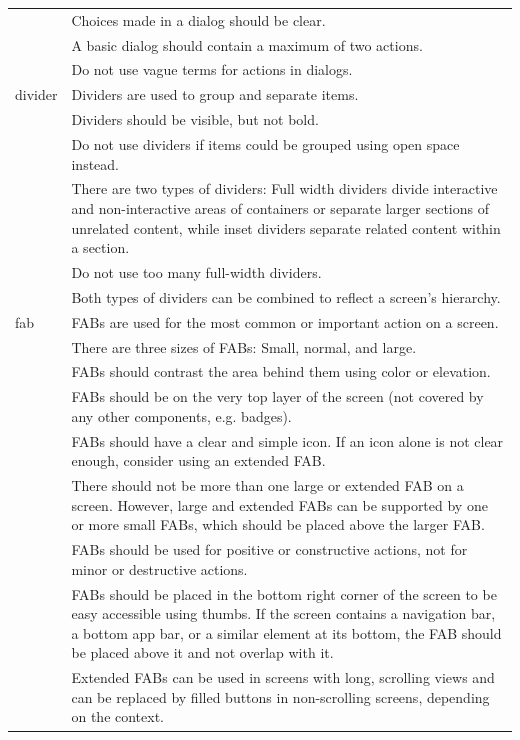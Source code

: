 \documentclass[11pt,titlepage,oneside,openany]{book}
\begin{document}
\begin{longtable}{|p{}|p{}|}
	~ & Choices made in a dialog should be clear. \\ 
	~ & A basic dialog should contain a maximum of two actions. \\ 
	~ & Do not use vague terms for actions in dialogs. \\ \hline
	divider & Dividers are used to group and separate items. \\ 
	~ & Dividers should be visible, but not bold. \\ 
	~ & Do not use dividers if items could be grouped using open space instead. \\ 
	~ & There are two types of dividers: Full width dividers divide interactive and non-interactive areas of containers or separate larger sections of unrelated content, while inset dividers separate related content within a section. \\ 
	~ & Do not use too many full-width dividers. \\ 
	~ & Both types of dividers can be combined to reflect a screen's hierarchy. \\ \hline
	fab & FABs are used for the most common or important action on a screen. \\ 
	~ & There are three sizes of FABs: Small, normal, and large. \\ 
	~ & FABs should contrast the area behind them using color or elevation. \\ 
	~ & FABs should be on the very top layer of the screen (not covered by any other components, e.g. badges). \\ 
	~ & FABs should have a clear and simple icon. If an icon alone is not clear enough, consider using an extended FAB. \\ 
	~ & There should not be more than one large or extended FAB on a screen. However, large and extended FABs can be supported by one or more small FABs, which should be placed above the larger FAB. \\ 
	~ & FABs should be used for positive or constructive actions, not for minor or destructive actions. \\ 
	~ & FABs should be placed in the bottom right corner of the screen to be easy accessible using thumbs. If the screen contains a navigation bar, a bottom app bar, or a similar element at its bottom, the FAB should be placed above it and not overlap with it. \\ 
	~ & Extended FABs can be used in screens with long, scrolling views and can be replaced by filled buttons in non-scrolling screens, depending on the context. \\ 

\end{longtable}
\end{document}
